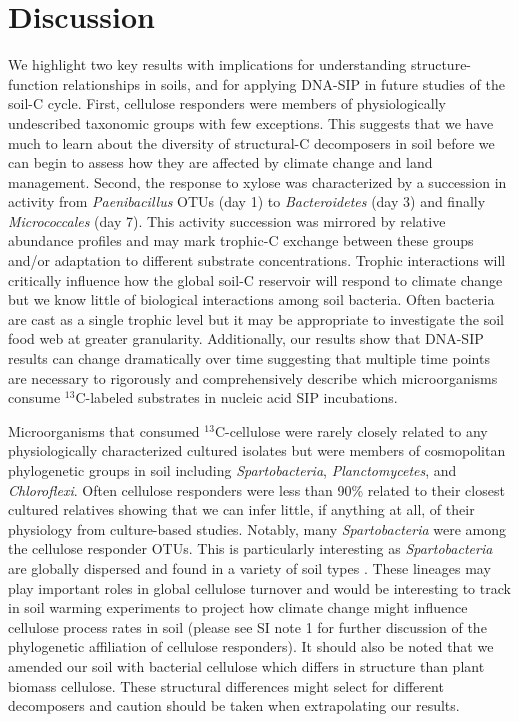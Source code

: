 \section{Discussion} 
We highlight two key results with implications for understanding structure-function
relationships in soils, and for applying DNA-SIP in future studies of the soil-C
cycle. First, cellulose responders were members of physiologically undescribed
taxonomic groups with few exceptions. This suggests that we have much to learn
about the diversity of structural-C decomposers in soil before we can begin to
assess how they are affected by climate change and land management. Second, the
response to xylose was characterized by a succession in activity from
\textit{Paenibacillus} OTUs (day 1) to \textit{Bacteroidetes} (day 3) and finally
\textit{Micrococcales} (day 7). This activity succession was mirrored by relative
abundance profiles and may mark trophic-C exchange between these groups and/or
adaptation to different substrate concentrations. Trophic interactions will
critically influence how the global soil-C reservoir will respond to climate
change \citep{Crowther2015} but we know little of biological interactions among
soil bacteria. Often bacteria are cast as a single trophic level
\citep{Moore1988} but it may be appropriate to investigate the soil food web at
greater granularity. Additionally, our results show that DNA-SIP results can
change dramatically over time suggesting that multiple time points are
necessary to rigorously and comprehensively describe which microorganisms
consume $^{13}$C-labeled substrates in nucleic acid SIP incubations.

Microorganisms that consumed $^{13}$C-cellulose were rarely closely related to any
physiologically characterized cultured isolates but were members of
cosmopolitan phylogenetic groups in soil including \textit{Spartobacteria},
\textit{Planctomycetes}, and \textit{Chloroflexi}. Often cellulose responders
were less than 90\% related to their closest cultured relatives showing that we
can infer little, if anything at all, of their physiology from culture-based
studies. Notably, many \textit{Spartobacteria} were among the cellulose responder OTUs.
This is particularly interesting as \textit{Spartobacteria} are globally
dispersed and found in a variety of soil types \citep{Bergmann_2011}. These lineages may play
important roles in global cellulose turnover and would be interesting to track
in soil warming experiments to project how climate change might influence
cellulose process rates in soil (please see SI note 1 for further discussion of the
phylogenetic affiliation of cellulose responders). It should also be noted that
we amended our soil with bacterial cellulose which differs in structure than
plant biomass cellulose. These structural differences might select for different 
decomposers and caution should be taken when extrapolating our results.

